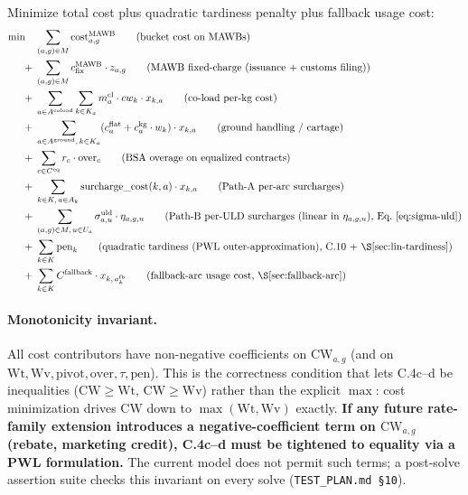 \documentclass[11pt,a4paper]{article}
\theoremstyle{definition}
\begin{document}
Minimize total cost plus quadratic tardiness penalty plus fallback usage cost:
\begin{align}
  \min \quad
  & \sum_{(a,g) \in M} \text{cost}^{\text{MAWB}}_{a,g}
    \tag{bucket cost on MAWBs} \\
  +\;
  & \sum_{(a,g) \in M} c^{\text{MAWB}}_{\text{fix}} \cdot z_{a,g}
    \tag{MAWB fixed-charge (issuance + customs filing)} \\
  +\;
  & \sum_{a \in A^{\text{coload}}} \sum_{k \in K_a} m_a^{\text{cl}} \cdot cw_k \cdot x_{k,a}
    \tag{co-load per-kg cost} \\
  +\;
  & \sum_{a \in A^{\text{ground}},\, k \in K_a} (c_a^{\text{flat}} + c_a^{\text{kg}} \cdot w_k) \cdot x_{k,a}
    \tag{ground handling / cartage} \\
  +\;
  & \sum_{c \in C^{\text{eq}}} r_c \cdot \text{over}_c
    \tag{BSA overage on equalized contracts} \\
  +\;
  & \sum_{k \in K,\, a \in A_k} \text{surcharge\_cost}(k, a) \cdot x_{k,a}
    \tag{Path-A per-arc surcharges} \\
  +\;
  & \sum_{(a,g) \in M,\, u \in U_a} \sigma^{\text{uld}}_{a,u} \cdot \eta_{a,g,u}
    \tag{Path-B per-ULD surcharges (linear in $\eta_{a,g,u}$), Eq.~\ref{eq:sigma-uld}} \\
  +\;
  & \sum_{k \in K} \text{pen}_k
    \tag{quadratic tardiness (PWL outer-approximation), C.10 + \S\ref{sec:lin-tardiness}} \\
  +\;
  & \sum_{k \in K} C^{\text{fallback}} \cdot x_{k,\, a^{\text{fb}}_k}
    \tag{fallback-arc usage cost, \S\ref{sec:fallback-arc}}
\end{align}

\paragraph{Monotonicity invariant.}
All cost contributors have non-negative coefficients on $\text{CW}_{a,g}$
(and on $\text{Wt}, \text{Wv}, \text{pivot}, \text{over}, \tau, \text{pen}$).
This is the
correctness condition that lets C.4c--d be inequalities ($\text{CW} \geq
\text{Wt},\, \text{CW} \geq \text{Wv}$) rather than the explicit $\max$: cost
minimization drives $\text{CW}$ down to $\max(\text{Wt}, \text{Wv})$ exactly.
\textbf{If any future rate-family extension introduces a negative-coefficient
term on $\text{CW}_{a,g}$ (rebate, marketing credit), C.4c--d must be
tightened to equality via a PWL formulation.} The current model does not
permit such terms; a post-solve assertion suite checks this invariant on
every solve (\texttt{TEST\_PLAN.md \S10}).
\end{document}
